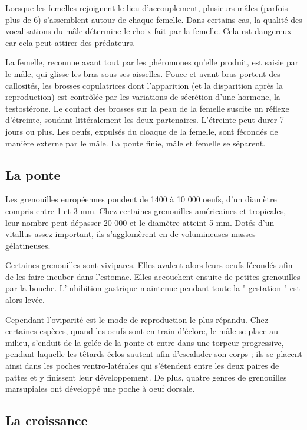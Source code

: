 Lorsque les femelles rejoignent le lieu d’accouplement, plusieurs mâles (parfois plus de 6) s’assemblent autour de chaque femelle. 
Dans certains cas, la qualité des vocalisations du mâle détermine le choix fait par la femelle. Cela est dangereux car cela peut attirer des prédateurs.

La femelle, reconnue avant tout par les phéromones qu’elle produit, est saisie par le mâle, qui glisse les bras sous ses aisselles. 
Pouce et avant-bras portent des callosités, les brosses copulatrices dont l’apparition (et la disparition après la reproduction) est contrôlée par les variations de sécrétion d’une hormone, la testostérone.
Le contact des brosses sur la peau de la femelle suscite un réflexe d’étreinte, soudant littéralement les deux partenaires. 
L’étreinte peut durer 7 jours ou plus. Les oeufs, expulsés du cloaque de la femelle, sont fécondés de manière externe par le mâle. La ponte finie, mâle et femelle se séparent.

 
\subsection{La ponte}

Les grenouilles européennes pondent de 1400 à 10 000 oeufs, d’un diamètre compris entre 1 et 3 mm. 
Chez certaines grenouilles américaines et tropicales, leur nombre peut dépasser 20 000 et le diamètre atteint 5 mm. 
Dotés d’un vitallus assez important, ils s’agglomèrent en de volumineuses masses gélatineuses.

Certaines grenouilles sont vivipares. 
Elles avalent alors leurs oeufs fécondés afin de les faire incuber dans l’estomac. 
Elles accouchent ensuite de petites grenouilles par la bouche. 
L’inhibition gastrique maintenue pendant toute la " gestation " est alors levée.

Cependant l’oviparité est le mode de reproduction le plus répandu. 
Chez certaines espèces, quand les oeufs sont en train d’éclore, le mâle se place au milieu, s’enduit de la gelée de la ponte et entre dans une torpeur progressive, pendant laquelle les têtards éclos sautent afin d’escalader son corps ; ils se placent ainsi dans les poches ventro-latérales qui s’étendent entre les deux paires de pattes et y finissent leur développement. 
De plus, quatre genres de grenouilles marsupiales ont développé une poche à oeuf dorsale.

         

\subsection{La croissance}

